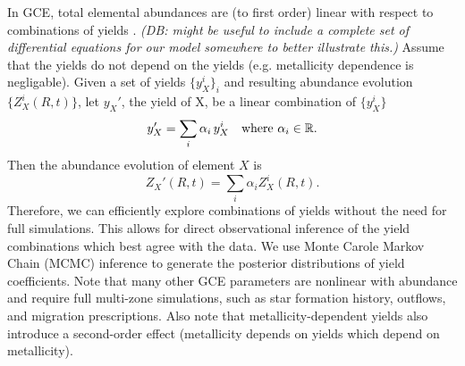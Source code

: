 \documentclass[fleqn,
usenatbib]{mnras}
\newcommand{\dbnote}[1]{ {\color{Thistle} \textit{\small (DB: #1)}} }
\begin{document}
In GCE, total elemental abundances are (to first order) linear with respect to combinations of yields \citep[e.g.][]{WAF17}.
\dbnote{might be useful to include a complete set of differential equations for our model somewhere to better illustrate this.}
Assume that the yields do not depend on the yields (e.g. metallicity dependence is negligable). 
Given a set of yields $\{y_X^i\}_i$ and resulting abundance evolution $\{Z_{X}^i(R, t) \}$, let $y_X'$, the yield of X, be a linear combination of $\{y_X^i\}$
\begin{equation}
    y_X' = \sum_i \alpha_i\, y_X^i \quad {\rm where\ } \alpha_i \in \mathbb{R}.
\end{equation}
Then the abundance evolution of element $X$ is
\begin{equation}\label{eq:lin_combo}
    Z_X'(R, t) = \sum_i \alpha_i Z_X^i(R, t).
\end{equation}
Therefore, we can efficiently explore combinations of yields without the need for full simulations. This allows for direct observational inference of the yield combinations which best agree with the data.
We use Monte Carole Markov Chain (MCMC) inference to generate the posterior distributions of yield coefficients. Note that many other GCE parameters are nonlinear with abundance and require full multi-zone simulations, such as star formation history, outflows, and migration prescriptions. 
Also note that metallicity-dependent yields also introduce a second-order effect (metallicity depends on yields which depend on metallicity).
\end{document}
